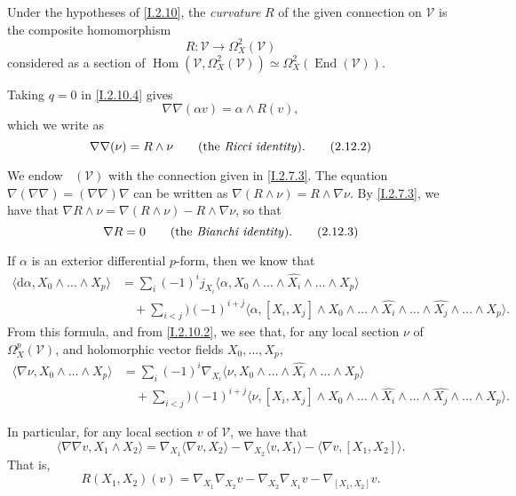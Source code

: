 \documentclass{report}
\theoremstyle{plain}
\theoremstyle{definition}
\newenvironment{definition}[1]
    {\renewcommand\theinnercustomdefinition{#1}\innercustomdefinition}
    {\endinnercustomdefinition}
\newenvironment{env}[1]
    {\renewcommand\theinnercustomenv{#1}\innercustomenv}
    {\endinnercustomenv}
\newcommand{\sh}[1]{{\mathscr{#1}}}
\newcommand{\dd}{\mathrm{d}}
\DeclareMathOperator{\Hom}{Hom}
\DeclareMathOperator{\End}{End}
\DeclareMathOperator{\shEnd}{\underline{End}}
\newcommand{\oldpage}[1]{\marginpar{\footnotesize$\Big\vert$ \textit{p.~#1}}}
\begin{document}
\begin{definition}{2.11}
\label{I.2.11}
  Under the hypotheses of \cref{I.2.10}, the \emph{curvature} $R$ of the given connection on $\sh{V}$ is the composite homomorphism
  \[
    R\colon \sh{V} \to \Omega_X^2(\sh{V})
  \]
  considered as a section of $\Hom(\sh{V},\Omega_X^2(\sh{V})) \simeq \Omega_X^2(\End(\sh{V}))$.
\end{definition}

\begin{env}{2.12}
\label{I.2.12}
  Taking $q=0$ in \cref{I.2.10.4} gives
  \[
  \label{I.2.12.1}
    \nabla\nabla(\alpha v) = \alpha\wedge R(v),
  \tag{2.12.1}
  \]
  which we write as
\oldpage{11}
  \[
  \label{I.2.12.2}
    \nabla\nabla(\nu) = R\wedge\nu
    \qquad\mbox{(the \emph{Ricci identity}).}
  \tag{2.12.2}
  \]

  We endow $\shEnd(\sh{V})$ with the connection given in \cref{I.2.7.3}.
  The equation $\nabla(\nabla\nabla)=(\nabla\nabla)\nabla$ can be written as $\nabla(R\wedge\nu) = R\wedge\nabla\nu$.
  By \cref{I.2.7.3}, we have that $\nabla R\wedge\nu = \nabla(R\wedge\nu) - R\wedge\nabla\nu$, so that
  \[
  \label{I.2.12.3}
    \nabla R=0
    \qquad\mbox{(the \emph{Bianchi identity}).}
  \tag{2.12.3}
  \]
\end{env}

\begin{env}{2.13}
\label{I.2.13}
  If $\alpha$ is an exterior differential $p$-form, then we know that
  \[
    \begin{aligned}
      \langle \dd\alpha, X_0\wedge\ldots\wedge X_p \rangle
      &= \sum_i(-1)^i j_{X_i}\langle \alpha, X_0\wedge\ldots\wedge\widehat{X_i}\wedge\ldots\wedge X_p \rangle
    \\&\quad+ \sum_{i<j})(-1)^{i+j} \langle \alpha, [X_i,X_j]\wedge X_0\wedge\ldots\wedge\widehat{X_i}\wedge\ldots\wedge\widehat{X_j}\wedge\ldots\wedge X_p \rangle.
    \end{aligned}
  \]
  From this formula, and from \cref{I.2.10.2}, we see that, for any local section $\nu$ of $\Omega_X^p(\sh{V})$, and holomorphic vector fields $X_0,\ldots,X_p$,
  \[
  \label{I.2.13.1}
    \begin{aligned}
      \langle \nabla\nu, X_0\wedge\ldots\wedge X_p \rangle
      &= \sum_i(-1)^i \nabla_{X_i}\langle \nu, X_0\wedge\ldots\wedge\widehat{X_i}\wedge\ldots\wedge X_p \rangle
    \\&\quad+ \sum_{i<j})(-1)^{i+j} \langle \nu, [X_i,X_j]\wedge X_0\wedge\ldots\wedge\widehat{X_i}\wedge\ldots\wedge\widehat{X_j}\wedge\ldots\wedge X_p \rangle.
    \end{aligned}
  \tag{2.13.1}
  \]

  In particular, for any local section $v$ of $\sh{V}$, we have that
  \[
    \langle \nabla\nabla v, X_1\wedge X_2 \rangle
    = \nabla_{X_1}\langle \nabla v, X_2 \rangle - \nabla_{X_2}\langle v, X_1 \rangle - \langle \nabla v, [X_1,X_2] \rangle.
  \]
  That is,
  \[
  \label{I.2.13.2}
    R(X_1,X_2)(v) = \nabla_{X_1}\nabla_{X_2}v - \nabla_{X_2}\nabla_{X_1}v - \nabla_{[X_1,X_2]}v.
  \tag{2.13.2}
  \]
\end{env}
\end{document}
